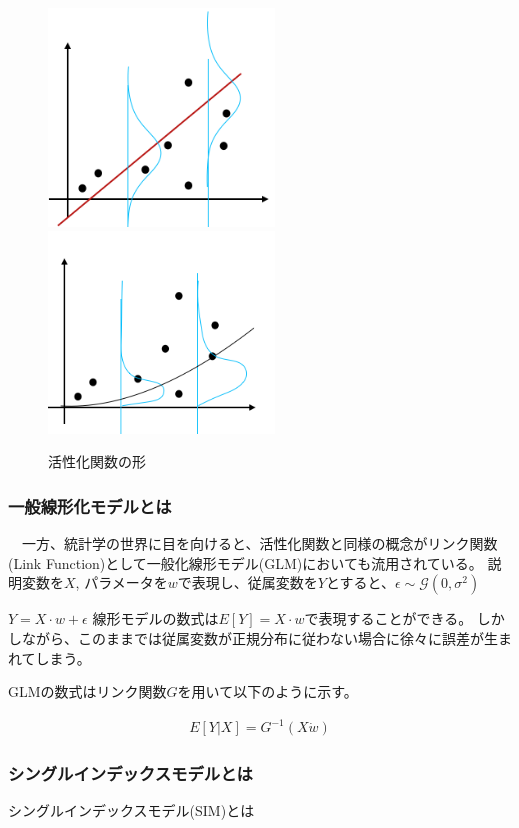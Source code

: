 \begin{figure}[hbtp]
        \includegraphics[width=6cm]{asset/glm1.png}~~~~~ ~~~~~ 
        \includegraphics[width=6cm]{asset/glm2.png}
            \caption{活性化関数の形}
            \label{neural_network1}
\end{figure}

\subsubsection{一般線形化モデルとは}
　一方、統計学の世界に目を向けると、活性化関数と同様の概念がリンク関数(Link Function)として一般化線形モデル(GLM)においても流用されている。
説明変数を$ X $, パラメータを$ w $で表現し、従属変数を$ Y $とすると、$ \epsilon \sim \mathcal{G}(0, \sigma^2) $

$ Y = X \cdot w + \epsilon $
線形モデルの数式は$ E[Y] = X\cdot w $で表現することができる。
しかしながら、このままでは従属変数が正規分布に従わない場合に徐々に誤差が生まれてしまう。

GLMの数式はリンク関数$ G $を用いて以下のように示す。

\begin{eqnarray}
E[Y|X]=G^{-1} (X\dot w)
\label{eq:link}
\end{eqnarray}

\subsubsection{シングルインデックスモデルとは}
シングルインデックスモデル(SIM)とは

